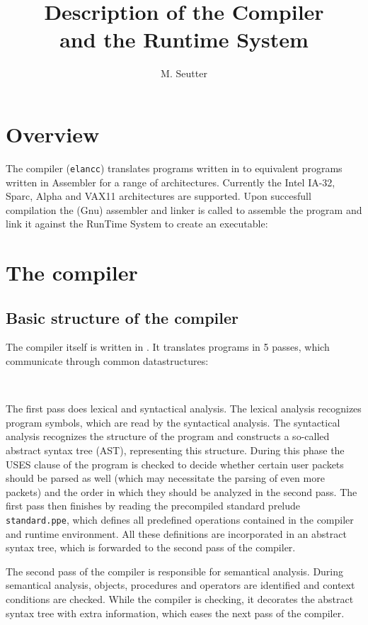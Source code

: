 \documentclass [a4paper,12pt,fleqn]{article}
\title {Description of the \ELAN Compiler\\
and the \ELAN Runtime System}
\author {M. Seutter}
\begin{document}
\maketitle
\section {Overview}
The \ELAN compiler (\verb+elancc+) translates programs written in \ELAN
to equivalent programs written in Assembler for a range of architectures.
Currently the Intel IA-32, Sparc, Alpha and VAX11 architectures are
supported. Upon succesfull compilation the (Gnu) assembler and linker
is called to assemble the program and link it against the \ELAN RunTime
System to create an executable:
\begin{center}
\end{center}
\section {The \ELAN compiler}
\subsection {Basic structure of the \ELAN compiler}
The \ELAN compiler itself is written in \Cns. It translates \ELAN programs
in 5 passes, which communicate through common datastructures:
\vspace*{1ex}
\begin{center}
~
\end{center}
\vspace*{1ex}
The first pass does lexical and syntactical analysis. The lexical analysis
recognizes program symbols, which are read by the syntactical analysis.
The syntactical analysis recognizes the structure of the program and
constructs a so-called abstract syntax tree (AST), representing this
structure. During this phase the USES clause of the program is checked
to decide whether certain user packets should be parsed as well (which
may necessitate the parsing of even more packets) and the order in which
they should be analyzed in the second pass. The first pass then finishes
by reading the precompiled standard prelude \verb+standard.ppe+, which
defines all predefined operations contained in the \ELAN compiler and
runtime environment. All these definitions are incorporated in an
abstract syntax tree, which is forwarded to the second pass of the compiler.

The second pass of the compiler is responsible for semantical analysis.
During semantical analysis, objects, procedures and operators are identified
and context conditions are checked. While the compiler is checking, it
decorates the abstract syntax tree with extra information, which eases
the next pass of the compiler.
\end{document}
